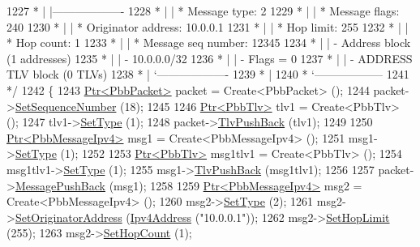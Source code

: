\begin{DoxyCode}
1227 \textcolor{comment}{         * |    |-------------------}
1228 \textcolor{comment}{         * |    | * Message type:       2}
1229 \textcolor{comment}{         * |    | * Message flags:  240}
1230 \textcolor{comment}{         * |    | * Originator address: 10.0.0.1}
1231 \textcolor{comment}{         * |    | * Hop limit:          255}
1232 \textcolor{comment}{         * |    | * Hop count:          1}
1233 \textcolor{comment}{         * |    | * Message seq number: 12345}
1234 \textcolor{comment}{         * |    | - Address block (1 addresses)}
1235 \textcolor{comment}{         * |    |     - 10.0.0.0/32}
1236 \textcolor{comment}{         * |    |     - Flags = 0}
1237 \textcolor{comment}{         * |    | - ADDRESS TLV block (0 TLVs)}
1238 \textcolor{comment}{         * |    `-------------------}
1239 \textcolor{comment}{         * |}
1240 \textcolor{comment}{         * `------------------}
1241 \textcolor{comment}{   */}
1242   \{
1243     \hyperlink{classns3_1_1Ptr}{Ptr<PbbPacket>} packet = Create<PbbPacket> ();
1244     packet->\hyperlink{classns3_1_1PbbPacket_a7d6a1602be86109760d0f26ff9bbbb8e}{SetSequenceNumber} (18);
1245 
1246     \hyperlink{classns3_1_1Ptr}{Ptr<PbbTlv>} tlv1 = Create<PbbTlv> ();
1247     tlv1->\hyperlink{classns3_1_1PbbTlv_a90a0452018ed364ac37c3ad116dd718b}{SetType} (1);
1248     packet->\hyperlink{classns3_1_1PbbPacket_a34935793e729a106c176db99c969cb42}{TlvPushBack} (tlv1);
1249 
1250     \hyperlink{classns3_1_1Ptr}{Ptr<PbbMessageIpv4>} msg1 = Create<PbbMessageIpv4> ();
1251     msg1->\hyperlink{classns3_1_1PbbMessage_a4b3d1eaabd3e7412a46ac79bf3360dac}{SetType} (1);
1252 
1253     \hyperlink{classns3_1_1Ptr}{Ptr<PbbTlv>} msg1tlv1 = Create<PbbTlv> ();
1254     msg1tlv1->\hyperlink{classns3_1_1PbbTlv_a90a0452018ed364ac37c3ad116dd718b}{SetType} (1);
1255     msg1->\hyperlink{classns3_1_1PbbMessage_aac70b2672f79765cf5cc5b6666018165}{TlvPushBack} (msg1tlv1);
1256 
1257     packet->\hyperlink{classns3_1_1PbbPacket_a4a3170001ef758d9c9c4375b8f089826}{MessagePushBack} (msg1);
1258 
1259     \hyperlink{classns3_1_1Ptr}{Ptr<PbbMessageIpv4>} msg2 = Create<PbbMessageIpv4> ();
1260     msg2->\hyperlink{classns3_1_1PbbMessage_a4b3d1eaabd3e7412a46ac79bf3360dac}{SetType} (2);
1261     msg2->\hyperlink{classns3_1_1PbbMessage_a52ac135a2bec53db5e8f46b8b8a25e7c}{SetOriginatorAddress} (\hyperlink{classns3_1_1Ipv4Address}{Ipv4Address} (\textcolor{stringliteral}{"10.0.0.1"}));
1262     msg2->\hyperlink{classns3_1_1PbbMessage_a532a7e5e135f7491f8a84ab1dfadd28f}{SetHopLimit} (255);
1263     msg2->\hyperlink{classns3_1_1PbbMessage_a882ec7e2e9a9dff6297152c196d54ce4}{SetHopCount} (1);

\end{DoxyCode}
